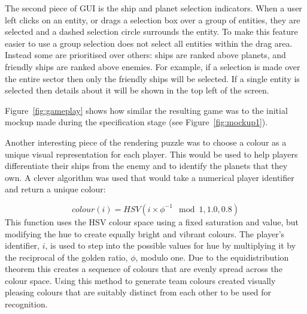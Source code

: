 The second piece of GUI is the ship and planet selection indicators. When a user left clicks on an entity, or drags a selection box over a group of entities, they are selected and a dashed selection circle surrounds the entity. To make this feature easier to use a group selection does not select all entities within the drag area. Instead some are prioritised over others: ships are ranked above planets, and friendly ships are ranked above enemies. For example, if a selection is made over the entire sector then only the friendly ships will be selected. If a single entity is selected then details about it will be shown in the top left of the screen.

Figure~\ref{fig:gameplay} shows how similar the resulting game was to the initial mockup made during the specification stage (see Figure~\ref{fig:mockup1}).


Another interesting piece of the rendering puzzle was to choose a colour as a unique visual representation for each player. This would be used to help players differentiate their ships from the enemy and to identify the planets that they own. A clever algorithm was used that would take a numerical player identifier and return a unique colour:\cite{ankerl2009}

\begin{equation*}
	colour(i) = HSV(i \times \phi^{-1} \mod 1, 1.0, 0.8)
\end{equation*}
\noindent
This function uses the HSV colour space using a fixed saturation and value, but modifying the hue to create equally bright and vibrant colours. The player's identifier, $i$, is used to step into the possible values for hue by multiplying it by the reciprocal of the golden ratio, $\phi$, modulo one. Due to the equidistribution theorem this creates a sequence of colours that are evenly spread across the colour space. Using this method to generate team colours created visually pleasing colours that are suitably distinct from each other to be used for recognition.
